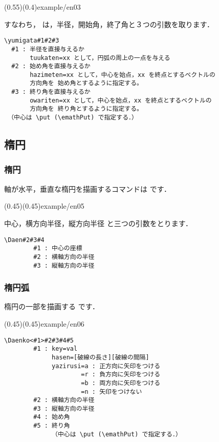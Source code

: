 (0.55)(0.4){example/en03}

すなわち， は，半径，開始角，終了角と３つの引数を取ります．

\begin{boxnote}
\begin{verbatim}
\yumigata#1#2#3
  #1 : 半径を直接与えるか
       tuukaten=xx として，円弧の周上の一点を与える
  #2 : 始め角を直接与えるか
       hazimeten=xx として，中心を始点，xx を終点とするベクトルの
       方向角を 始め角とするように指定する。
  #3 : 終り角を直接与えるか
       owariten=xx として，中心を始点，xx を終点とするベクトルの
       方向角を 終り角とするように指定する。
 （中心は \put (\emathPut) で指定する．）
\end{verbatim}
\end{boxnote}

\subsection{楕円}
\subsubsection{楕円}
軸が水平，垂直な楕円を描画するコマンドは  です．

(0.45)(0.45){example/en05}

中心，横方向半径，縦方向半径 と三つの引数をとります．

\begin{boxnote}
\begin{verbatim}
\Daen#2#3#4
        #1 : 中心の座標
        #2 : 横軸方向の半径
        #3 : 縦軸方向の半径
\end{verbatim}
\end{boxnote}

\subsubsection{楕円弧}
楕円の一部を描画する  です．

(0.45)(0.45){example/en06}

\begin{boxnote}
\begin{verbatim}
\Daenko<#1>#2#3#4#5
        #1 : key=val
             hasen=[破線の長さ][破線の間隔]
             yazirusi=a : 正方向に矢印をつける
                     =r : 負方向に矢印をつける
                     =b : 両方向に矢印をつける
                     =n : 矢印をつけない
        #2 : 横軸方向の半径
        #3 : 縦軸方向の半径
        #4 : 始め角
        #5 : 終り角
             （中心は \put (\emathPut) で指定する．）
\end{verbatim}
\end{boxnote}

